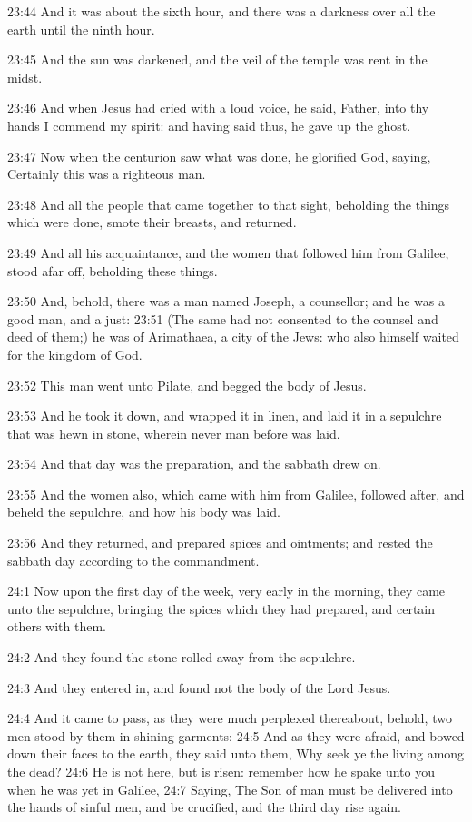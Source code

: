 23:44 And it was about the sixth hour, and there was a darkness over
all the earth until the ninth hour.

23:45 And the sun was darkened, and the veil of the temple was rent in
the midst.

23:46 And when Jesus had cried with a loud voice, he said, Father,
into thy hands I commend my spirit: and having said thus, he gave up
the ghost.

23:47 Now when the centurion saw what was done, he glorified God,
saying, Certainly this was a righteous man.

23:48 And all the people that came together to that sight, beholding
the things which were done, smote their breasts, and returned.

23:49 And all his acquaintance, and the women that followed him from
Galilee, stood afar off, beholding these things.

23:50 And, behold, there was a man named Joseph, a counsellor; and he
was a good man, and a just: 23:51 (The same had not consented to the
counsel and deed of them;) he was of Arimathaea, a city of the Jews:
who also himself waited for the kingdom of God.

23:52 This man went unto Pilate, and begged the body of Jesus.

23:53 And he took it down, and wrapped it in linen, and laid it in a
sepulchre that was hewn in stone, wherein never man before was laid.

23:54 And that day was the preparation, and the sabbath drew on.

23:55 And the women also, which came with him from Galilee, followed
after, and beheld the sepulchre, and how his body was laid.

23:56 And they returned, and prepared spices and ointments; and rested
the sabbath day according to the commandment.

24:1 Now upon the first day of the week, very early in the morning,
they came unto the sepulchre, bringing the spices which they had
prepared, and certain others with them.

24:2 And they found the stone rolled away from the sepulchre.

24:3 And they entered in, and found not the body of the Lord Jesus.

24:4 And it came to pass, as they were much perplexed thereabout,
behold, two men stood by them in shining garments: 24:5 And as they
were afraid, and bowed down their faces to the earth, they said unto
them, Why seek ye the living among the dead?  24:6 He is not here, but
is risen: remember how he spake unto you when he was yet in Galilee,
24:7 Saying, The Son of man must be delivered into the hands of sinful
men, and be crucified, and the third day rise again.


